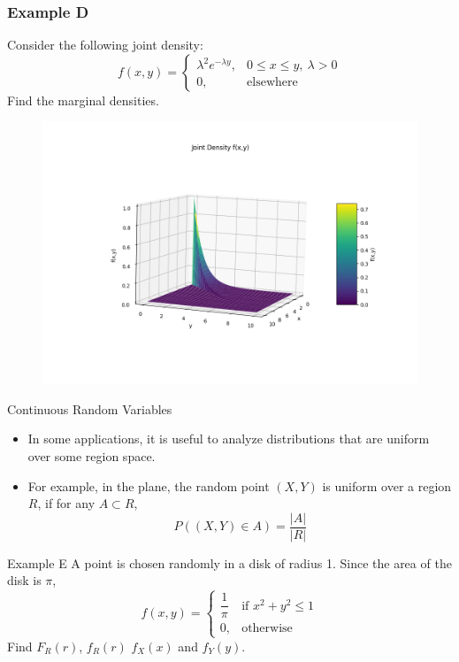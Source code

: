 \documentclass{beamer}
\begin{document}
\begin{frame}
    \frametitle{Example D}

    Consider the following joint density:
    \[f(x,y)= \begin{cases}
        \lambda^2 e^{-\lambda y}, & 0 \leq x \leq y, ~\lambda >0\\
        0, & \text{elsewhere}
    \end{cases}\] Find the marginal densities. 
    \begin{figure}
        \includegraphics[scale=0.4]{Figures/fig_9.png}
    \end{figure}
    

\end{frame}

\begin{frame}{Continuous Random Variables}
    \begin{itemize}
        \item In some applications, it is useful to analyze distributions that are uniform over some region space. 
        \item For example, in the plane, the random point \((X,Y)\) is uniform over a region \(R\), if for any \(A \subset R\), \[P((X,Y) \in A)=\dfrac{|A|}{|R|}\]
    \end{itemize}    
\end{frame}

\begin{frame}{Example E}
    A point is chosen randomly in a disk of radius 1. Since the area of the disk is \(\pi\), \[f(x,y)= \begin{cases}
        \dfrac{1}{\pi} & \text{if }x^2+y^2\leq 1\\
        0, & \text{otherwise}
    \end{cases}\] Find \(F_R(r)\), \(f_R(r)\)  \(f_X(x)\) and \(f_Y(y)\). 
\end{frame}
\end{document}
